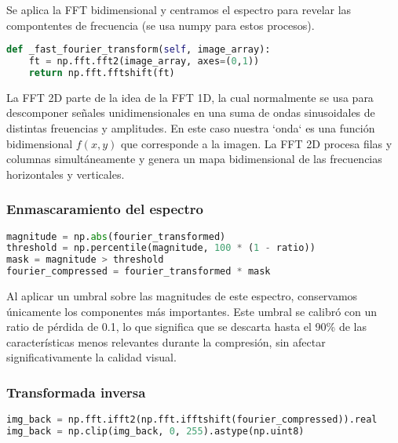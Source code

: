 Se aplica la FFT bidimensional y centramos el espectro para revelar las compontentes de frecuencia (se usa numpy para estos procesos).

\begin{lstlisting}[language=Python, caption={Método \_fast\_fourier\_transform}, label={lst:fft2d}]
def _fast_fourier_transform(self, image_array):
    ft = np.fft.fft2(image_array, axes=(0,1))
    return np.fft.fftshift(ft)
\end{lstlisting}

La FFT 2D parte de la idea de la FFT 1D, la cual normalmente se usa para descomponer señales unidimensionales en una suma de ondas sinusoidales de distintas freuencias y amplitudes. En este caso nuestra `onda` es una función bidimensional \(f(x,y)\) que corresponde a la imagen.
La FFT 2D procesa filas y columnas simultáneamente y genera un mapa bidimensional de las frecuencias horizontales y verticales.

\newpage

\subsubsection{Enmascaramiento del espectro}

\begin{lstlisting}[language=Python, caption={Enmascaramiento del espectro}, label={lst:masking}]
magnitude = np.abs(fourier_transformed)
threshold = np.percentile(magnitude, 100 * (1 - ratio))
mask = magnitude > threshold
fourier_compressed = fourier_transformed * mask
\end{lstlisting}

Al aplicar un umbral sobre las magnitudes de este espectro, conservamos únicamente los componentes más importantes. Este umbral se calibró con un ratio de pérdida de 0.1, lo que significa que se descarta hasta el 90\% de las características menos relevantes durante la compresión, sin afectar significativamente la calidad visual.

\subsubsection{Transformada inversa}

\begin{lstlisting}[language=Python, caption={Transformada inversa}, label={lst:inverse_transform}]
img_back = np.fft.ifft2(np.fft.ifftshift(fourier_compressed)).real
img_back = np.clip(img_back, 0, 255).astype(np.uint8)
\end{lstlisting}

